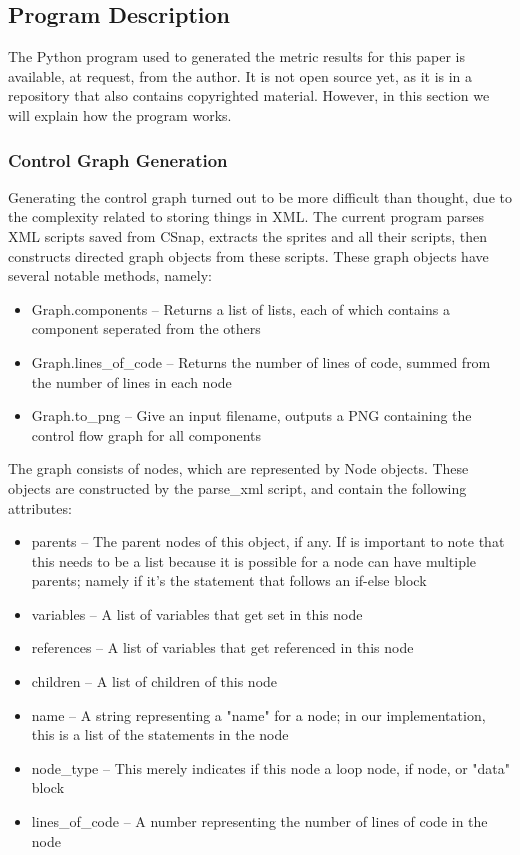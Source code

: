 \documentclass[]{article}
\begin{document}
\subsection{Program Description}

The Python program used to generated the metric results for this paper is available, at request, from the author.
It is not open source yet, as it is in a repository that also contains copyrighted material.
However, in this section we will explain how the program works.

\subsubsection{Control Graph Generation}

Generating the control graph turned out to be more difficult than thought, due to the complexity related to storing things in XML.
The current program parses XML scripts saved from CSnap, extracts the sprites and all their scripts, then constructs directed graph objects from these scripts.
These graph objects have several notable methods, namely:
\begin{itemize}
	\item Graph.components -- Returns a list of lists, each of which contains a component seperated from the others
	\item Graph.lines\_of\_code -- Returns the number of lines of code, summed from the number of lines in each node
	\item Graph.to\_png -- Give an input filename, outputs a PNG containing the control flow graph for all components
\end{itemize}

The graph consists of nodes, which are represented by Node objects.
These objects are constructed by the parse\_xml script, and contain the following attributes:
\begin{itemize}
	\item parents -- The parent nodes of this object, if any. If is important to note that this needs to be a list because it is possible for a node can have multiple parents; namely if it's the statement that follows an if-else block
	\item variables -- A list of variables that get set in this node
	\item references -- A list of variables that get referenced in this node
	\item children -- A list of children of this node
	\item name -- A string representing a "name" for a node; in our implementation, this is a list of the statements in the node
	\item node\_type -- This merely indicates if this node a loop node, if node, or "data" block
	\item lines\_of\_code -- A number representing the number of lines of code in the node
\end{itemize}
\end{document}
